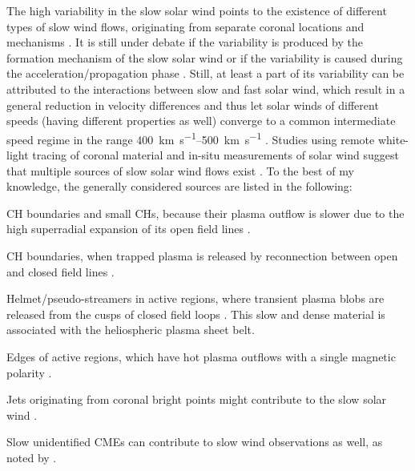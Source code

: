 The high variability in the slow solar wind points to the existence of different types of slow wind flows, originating from separate coronal locations and mechanisms \citep{Schwenn1983}. It is still under debate if the variability is produced by the formation mechanism of the slow solar wind or if the variability is caused during the acceleration/propagation phase \citep{Sanchez-Diaz2016}. Still, at least a part of its variability can be attributed to the interactions between slow and fast solar wind, which result in a general reduction in velocity differences and thus let solar winds of different speeds (having different properties as well) converge to a common intermediate speed regime in the range \SIrange{400}{500}{\km\per\s} \citep{McGregor2011a,Sanchez-Diaz2016}. Studies using remote white-light tracing of coronal material and in-situ measurements of solar wind suggest that multiple sources of slow solar wind flows exist \citep{Wang2000,Kilpua2016}. To the best of my knowledge, the generally considered sources are listed in the following:
\begin{itemize*}
	\item CH boundaries and small CHs, because their plasma outflow is slower due to the high superradial expansion of its open field lines \citep{Wang1990}.
	\item CH boundaries, when trapped plasma is released by reconnection between open and closed field lines \citep{Madjarska2004}.
	\item Helmet/pseudo-streamers in active regions, where transient plasma blobs are released from the cusps of closed field loops \citep{Wang1998,Wang2000}. This slow and dense material is associated with the heliospheric plasma sheet belt.
	\item Edges of active regions, which have hot plasma outflows with a single magnetic polarity \citep{Kojima1999}.
	\item Jets originating from coronal bright points might contribute to the slow solar wind \citep{Subramanian2010}.
	\item Slow unidentified CMEs can contribute to slow wind observations as well, as noted by \citet{Wang2000}.
\end{itemize*}

